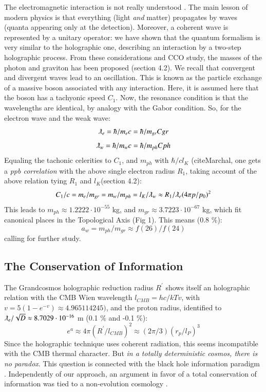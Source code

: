 \documentclass[twoside,draft]{article}
\begin{document}
\begin{sloppypar}
The electromagnetic interaction is not really understood \cite{Okun}. The main lesson of modern physics is that everything (light \textit{and} matter) propagates by waves (quanta appearing only at the detection). Moreover, a coherent wave is represented by a unitary operator: we have shown that the quantum formalism is very similar to the holographic one, describing an interaction by a two-step holographic process. From these considerations and CCO study, the masses of the photon and graviton has been proposed (section 4.2). We recall that convergent and divergent waves lead to an oscillation\cite{Sanchez1}. This is known as the particle exchange of a massive boson associated with any interaction. Here, it is assumed here that the boson has a tachyonic speed $C_1$. Now, the resonance condition is that the wavelengths are identical, by analogy with the Gabor condition\cite{Gabor}. So, for the electron wave and the weak wave:
\begin{equation}
\lambdabar_e = \hbar/m_e c = \hbar / m_{gr}C{gr}
\end{equation}
\begin{equation}
\lambdabar_w = \hbar/m_w c = \hbar / m_{ph}C{ph}
\end{equation}
Equaling the tachonic celerities to $C_1$, and $m_{ph}$ with $\hbar/cl_K$ (cite{Marchal}, one gets a \textit{ppb correlation} with the above single electron radius $R_1$, taking account of the above relation tying $R_1$ and $l_K$(section 4.2):
\begin{equation}
C_1/c = m_e/m_{gr} = m_w/m_{ph} = l_K/\lambdabar_w \approx R_1/\lambdabar_e (4\pi p/p_0)^2 
\end{equation}
This leads to $m_{ph} \approx 1.2222\cdot 10^{-55}$ kg, and  $m_{gr} \approx 3.7223\cdot 10^{-67}$ kg, which fit canonical places in the Topological Axis (Fig 1). This means (0.8 \%):
\begin{equation}
a_w = m_{ph}/m_{gr} \approx f(26)/f(24) 
\end{equation}
calling for further study.

\subsection{The Conservation of Information}

The Grandcosmos holographic reduction radius $R^{\prime}$ shows itself an holographic
relation with the CMB Wien wavelength $l_{CMB} = hc/kTv $, with $v = 5 (1-e^{-v}) \approx 4.965114245)$, and the proton radius, identified to $\lambdabar_e/\sqrt{D} \approx 8.7029\cdot 10^{-16}$ m (0.1 \% and -0.1 \%):
\begin{equation}
e^{a} \approx 4\pi(R^{\prime}/l_{CMB})^{2} \approx (2\pi /3) (r_p/l_P)^3 
\end{equation}
Since the holographic technique uses coherent radiation, this seems incompatible with the CMB
thermal character. But \textit{in a totally deterministic cosmos, there is no paradox}. This question is
connected with the black hole information paradigm \cite{Preskill}. Independently of our approach, an
argument in favor of a total conservation of information was tied to a non-evolution cosmology
\cite{Nikolic}. 


\end{sloppypar}
\end{document}
